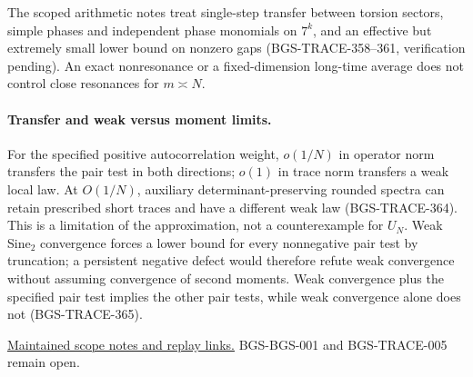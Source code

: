 The scoped arithmetic notes treat single-step transfer between
torsion sectors, simple phases and independent phase monomials on
\(7^k\), and an effective but extremely small lower bound on nonzero
gaps (BGS-TRACE-358--361, verification pending). An exact nonresonance
or a fixed-dimension long-time average does not control close
resonances for \(m\asymp N\).

\paragraph{Transfer and weak versus moment limits.}
For the specified positive autocorrelation weight, \(o(1/N)\) in
operator norm transfers the pair test in both directions; \(o(1)\) in
trace norm transfers a weak local law. At \(O(1/N)\), auxiliary
determinant-preserving rounded spectra can retain prescribed short
traces and have a different weak law (BGS-TRACE-364). This is a
limitation of the approximation, not a counterexample for \(U_N\).
Weak Sine\(_2\) convergence forces a lower bound for every nonnegative
pair test by truncation; a persistent negative defect would therefore
refute weak convergence without assuming convergence of second
moments. Weak convergence plus the specified pair test implies the
other pair tests, while weak convergence alone does not (BGS-TRACE-365).

\noindent
\href{https://github.com/ChurilovMaksim/BGS/tree/main/mathematics/fixed-map/archive_continuation}
{Maintained scope notes and replay links.}
BGS-BGS-001 and BGS-TRACE-005 remain open.
